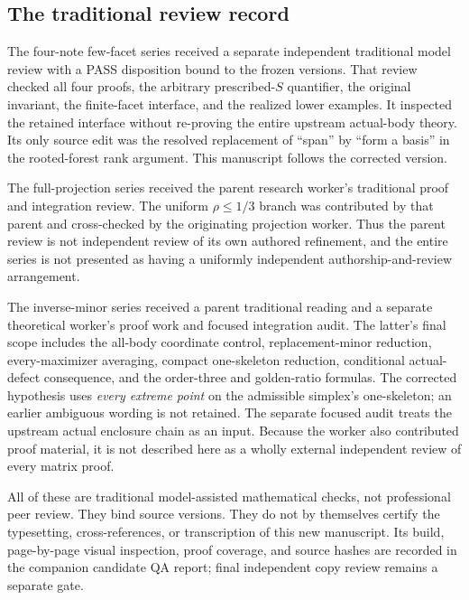 \subsection{The traditional review record}
The four-note few-facet series received a separate independent traditional
model review with a PASS disposition bound to the frozen versions.
That review checked all four proofs, the arbitrary prescribed-$S$
quantifier, the original invariant, the finite-facet interface, and the
realized lower examples. It inspected the retained interface without
re-proving the entire upstream actual-body theory. Its only source edit
was the resolved replacement of ``span'' by ``form a basis'' in the
rooted-forest rank argument. This manuscript follows the corrected version.

The full-projection series received the parent research worker's
traditional proof and integration review. The uniform $\rho\le1/3$
branch was contributed by that parent and cross-checked by the originating
projection worker. Thus the parent review is not independent review of
its own authored refinement, and the entire series is not presented as
having a uniformly independent authorship-and-review arrangement.

The inverse-minor series received a parent traditional reading and a
separate theoretical worker's proof work and focused integration audit.
The latter's final scope includes the all-body coordinate control,
replacement-minor reduction, every-maximizer averaging, compact
one-skeleton reduction, conditional actual-defect consequence, and the
order-three and golden-ratio formulas. The corrected hypothesis uses
\emph{every extreme point} on the admissible simplex's one-skeleton;
an earlier ambiguous wording is not retained. The separate focused audit
treats the upstream actual enclosure chain as an input. Because the
worker also contributed proof material, it is not described here as a
wholly external independent review of every matrix proof.

All of these are traditional model-assisted mathematical checks, not
professional peer review. They bind source versions. They do not by
themselves certify the typesetting, cross-references, or transcription of
this new manuscript. Its build, page-by-page visual inspection, proof
coverage, and source hashes are recorded in the companion candidate QA
report; final independent copy review remains a separate gate.

